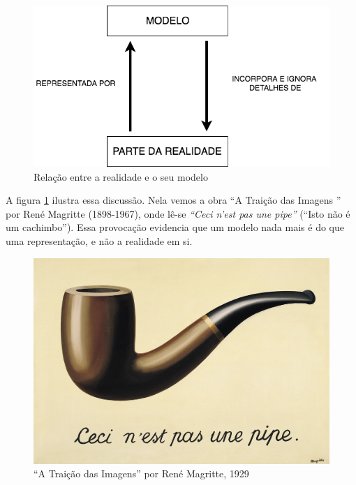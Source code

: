 \begin{figure}[htb]
	\caption{Relação entre a realidade e o seu modelo}
	\begin{center}
	    \includegraphics[scale=0.65]{imagens/modelo_e_realidade.png}
	\end{center}
\end{figure}

A figura \ref{fig:pipe} ilustra essa discussão. Nela vemos a obra ``A Traição das Imagens '' por René Magritte (1898-1967), onde lê-se \textit{``Ceci n'est pas une pipe''} (``Isto não é um cachimbo''). Essa provocação evidencia que um modelo nada mais é do que uma representação, e não a realidade em si.

\begin{figure}[htb]
	\caption{``A Traição das Imagens'' por René Magritte, 1929}
	\begin{center}
	    \includegraphics[scale=0.75]{imagens/pipe}
	\end{center}
	\label{fig:pipe}
\end{figure}

